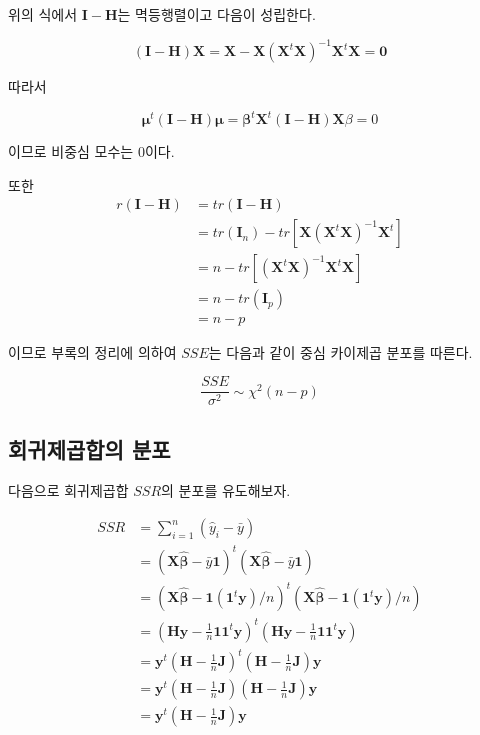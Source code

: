 \documentclass[
]{book}
\theoremstyle{definition}
\theoremstyle{definition}
\theoremstyle{definition}
\theoremstyle{remark}
\begin{document}
위의 식에서 \(\bm I - \bm H\)는 멱등행렬이고 다음이 성립한다.

\begin{equation*}
(\bm I - \bm H) \bm X = \bm X - \bm X (\bm X^t \bm X)^{-1} \bm X^t \bm X = \bm 0
\end{equation*}

따라서

\begin{equation*}
\bm \mu^t (\bm I - \bm H)  \bm \mu = \bm \beta^t \bm X^t (\bm I - \bm H) \bm X \beta =0
\end{equation*}

이므로 비중심 모수는 0이다.

또한 \begin{align*}
r(\bm I - \bm H) & = tr(\bm I - \bm H) \\
      & = tr(\bm I_n) - tr \left [ \bm X (\bm X^t \bm X)^{-1} \bm X^t \right ]  \\
      & = n-tr \left [ (\bm X^t \bm X)^{-1} \bm X^t \bm X \right ] \\
      &=  n-tr (\bm I_p ) \\
      & = n-p
\end{align*}

이므로 부록의 정리에 의하여 \(SSE\)는 다음과 같이 중심 카이제곱 분포를
따른다.

\begin{equation}
\frac{SSE}{\sigma^2} \sim \chi^2(n-p)
\label{eq:distsse}
\end{equation}

\hypertarget{uxd68cuxadc0uxc81cuxacf1uxd569uxc758-uxbd84uxd3ec}{%
\subsection{회귀제곱합의 분포}\label{uxd68cuxadc0uxc81cuxacf1uxd569uxc758-uxbd84uxd3ec}}

다음으로 회귀제곱합 \(SSR\)의 분포를 유도해보자.

\begin{align*}
SSR & = \sum_{i=1}^n (\hat y_i - \bar y) \\
   & = (\bm X \hat {\bm \beta} - \bar y \bm 1 )^t (\bm X \hat {\bm \beta} - \bar y \bm 1 ) \\
   & = \left ( \bm X \hat {\bm \beta} -  \bm 1 (\bm 1^t \bm y)/n \right )^t   \left ( \bm X \hat {\bm \beta} -  \bm 1 (\bm 1^t \bm y)/n \right )\\
   & = \left ( \bm H \bm y-  \tfrac{1}{n} \bm 1 \bm 1^t \bm y \right )^t   \left ( \bm H \bm y-  \tfrac{1}{n} \bm 1 \bm 1^t \bm y \right ) \\
    & =  \bm y^t \left ( \bm H  -  \tfrac{1}{n} \bm J \right )^t   \left ( \bm H  -  \tfrac{1}{n} \bm J \right ) \bm y \\
    & = \bm y^t \left ( \bm H  -  \tfrac{1}{n} \bm J \right )   \left ( \bm H  -  \tfrac{1}{n} \bm J \right ) \bm y \\
     & = \bm y^t  \left ( \bm H  -  \tfrac{1}{n} \bm J \right ) \bm y \\
\end{align*}
\end{document}
